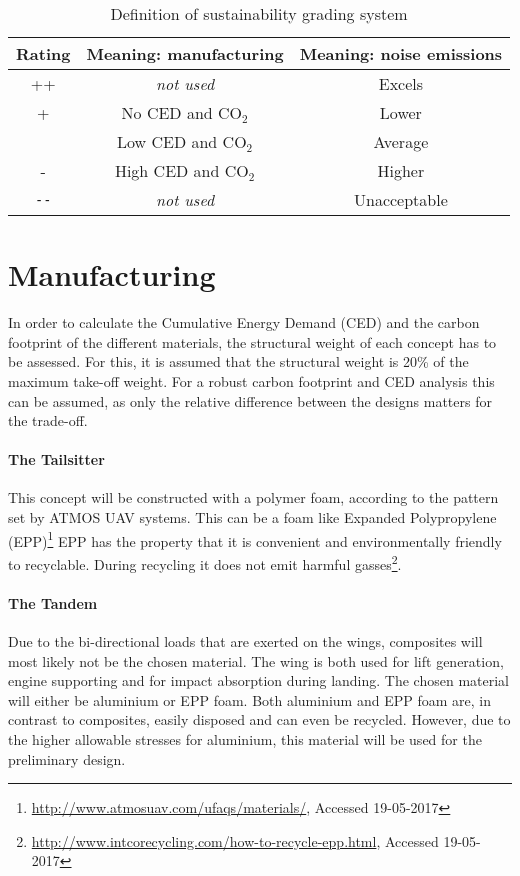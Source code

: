 \begin{table}[htb]
\centering
\caption{Definition of sustainability grading system}
\label{tab:susweight}
    \begin{tabular}{ccc}
        \toprule
        \textbf{Rating}           & \textbf{Meaning: manufacturing} &\textbf{Meaning: noise emissions}
        \\ \midrule
         ++            &    \textit{not used}     & Excels
        \\ \hdashline
        +               & No CED and CO$_{2}$ & Lower
        \\ \hdashline
         0          & Low CED and CO$_{2}$ & Average
        \\ \hdashline
          -           & High CED and CO$_{2}$ & Higher 
        \\ \hdashline
         \texttt{-{}-}    & \textit{not used} & Unacceptable
        \\ \bottomrule
    \end{tabular}
\end{table}


\section{Manufacturing}

In order to calculate the Cumulative Energy Demand (CED) and the carbon footprint of the different materials, the structural weight of each concept has to be assessed. For this, it is assumed that the structural weight is 20\% of the maximum take-off weight. For a robust carbon footprint and CED analysis this can be assumed, as only the relative difference between the designs matters for the trade-off.

\paragraph{The Tailsitter} This concept will be constructed with a polymer foam, according to the pattern set by ATMOS UAV systems. This can be a foam like Expanded Polypropylene (EPP)\footnote{\url{http://www.atmosuav.com/ufaqs/materials/}, Accessed 19-05-2017} 
EPP has the property that it is convenient and environmentally friendly to recyclable. During recycling it does not emit harmful gasses\footnote{\url{http://www.intcorecycling.com/how-to-recycle-epp.html}, Accessed 19-05-2017}.

\paragraph{The Tandem} Due to the bi-directional loads that are exerted on the wings, composites will most likely not be the chosen material. The wing is both used for lift generation, engine supporting and for impact absorption during landing. The chosen material will either be aluminium or EPP foam. Both aluminium and EPP foam are, in contrast to composites, easily disposed and can even be recycled. However, due to the higher allowable stresses for aluminium, this material will be used for the preliminary design.

